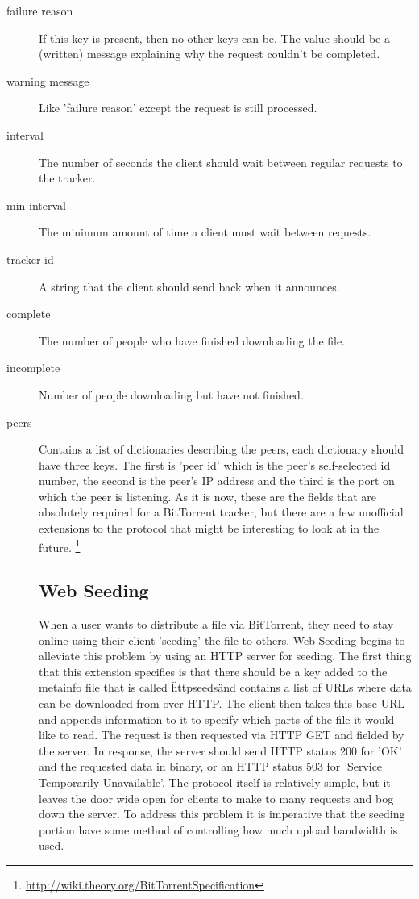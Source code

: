 \documentclass[a4paper,12pt]{report}
\begin{document}
\begin{description}
	\item[failure reason] If this key is present, then no other keys can be. The value should be a (written) message explaining why the request couldn't be completed.
	\item[warning message] Like 'failure reason' except the request is still processed.
	\item[interval] The number of seconds the client should wait between regular requests to the tracker.
	\item[min interval] The minimum amount of time a client must wait between requests.
	\item[tracker id] A string that the client should send back when it announces.
	\item[complete] The number of people who have finished downloading the file.
	\item[incomplete] Number of people downloading but have not finished.
	\item[peers] Contains a list of dictionaries describing the peers, each dictionary should have three keys. The first is 'peer id' which is the peer's self-selected id number, the second is the peer's IP address and the third is the port on which the peer is listening.
As it is now, these are the fields that are absolutely required for a BitTorrent tracker, but there are a few unofficial extensions to the protocol that might be interesting to look at in the future. \footnote{\url{http://wiki.theory.org/BitTorrentSpecification}}

\subsection{Web Seeding}
When a user wants to distribute a file via BitTorrent, they need to stay online using their client 'seeding' the file to others.
Web Seeding begins to alleviate this problem by using an HTTP server for seeding.
The first thing that this extension specifies is that there should be a key added to the metainfo file that is called \"httpseeds\" and contains a list of URLs where data can be downloaded from over HTTP.
The client then takes this base URL and appends information to it to specify which parts of the file it would like to read.
The request is then requested via HTTP GET and fielded by the server.
In response, the server should send HTTP status 200 for 'OK' and the requested data in binary, or an HTTP status 503 for 'Service Temporarily Unavailable'. 
The protocol itself is relatively simple, but it leaves the door wide open for clients to make to many requests and bog down the server.
To address this problem it is imperative that the seeding portion have some method of controlling how much upload bandwidth is used.



\end{description}
\end{document}
